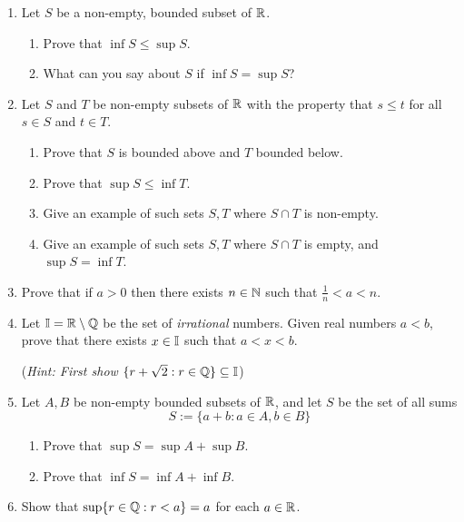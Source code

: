 \begin{exercises}{}{}
\begin{enumerate}
  
		\item %
		Let $S$ be a non-empty, bounded subset of $\mathbb{R}$.
  	\begin{enumerate}
		  \item Prove that $\inf S\le \sup S$. %
		  \item What can you say about $S$ if $\inf S=\sup S$?
  	\end{enumerate}
  
  
  	\goodbreak
  
  
	  \item %
	  Let $S$ and $T$ be non-empty subsets of $\mathbb{R}$ with the property that $s\le t$ for all $s\in S$ and $t\in T$.
	  \begin{enumerate}
		  \item Prove that $S$ is bounded above and $T$ bounded below.
		  \item Prove that $\sup S\le \inf T$.
		  \item Give an example of such sets $S,T$ where $S\cap T$ is non-empty.
		  \item Give an example of such sets $S,T$ where $S\cap T$ is empty, and $\sup S=\inf T$.
	  \end{enumerate}
  
  
	  \item %
	  Prove that if $a>0$ then there exists $n\in\mathbb{N}$ such that $\frac 1n<a<n$.
	  
	
	  \item%
	  \label{exs:irrdense} Let $\mathbb{I}=\mathbb{R}\setminus\mathbb{Q}$ be the set of \emph{irrational} numbers. Given real numbers $a<b$, prove that there exists $x\in\mathbb{I}$ such that $a<x<b$.\par
	  (\emph{Hint: First show $\{r+\sqrt 2:r\in\mathbb{Q}\}\subseteq\mathbb{I}$})
  

  	\item %
  	Let $A, B$ be non-empty bounded subsets of $\mathbb{R}$, and let $S$ be the set of all sums
  	\[
  		S:=\{a+b:a\in A,b\in B\}
  	\]
	  \begin{enumerate}
		  \item Prove that $\sup S=\sup A+\sup B$.
		  \item Prove that $\inf S=\inf A+\inf B$.
	  \end{enumerate}
  

  	\item%
  	Show that $\sup\{r\in \mathbb{Q}:r<a\}=a$ for each $a\in\mathbb{R}$.
  

\end{enumerate}
\end{exercises}
